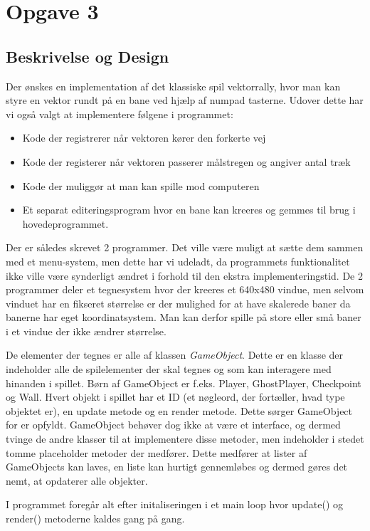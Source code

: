 \section{Opgave 3}
\subsection{Beskrivelse og Design}
Der ønskes en implementation af det klassiske spil vektorrally,
hvor man kan styre en vektor rundt på en bane ved hjælp af numpad tasterne.
Udover dette har vi også valgt at implementere følgene i programmet:
\begin{itemize}
  \item Kode der registrerer når vektoren kører den forkerte vej
  \item Kode der registerer når vektoren passerer målstregen og angiver antal træk
  \item Kode der muliggør at man kan spille mod computeren
  \item Et separat editeringsprogram hvor en bane kan kreeres og gemmes til brug i hovedeprogrammet.
\end{itemize}

Der er således skrevet 2 programmer. Det ville være muligt at sætte dem sammen med et menu-system,
men dette har vi udeladt, da programmets funktionalitet ikke ville være synderligt ændret i forhold til den ekstra implementeringstid.
De 2 programmer deler et tegnesystem hvor der kreeres et 640x480 vindue,
men selvom vinduet har en fikseret størrelse er der mulighed for at have skalerede baner da banerne har eget koordinatsystem.
Man kan derfor spille på store eller små baner i et vindue der ikke ændrer størrelse.

De elementer der tegnes er alle af klassen \emph{GameObject}. %
Dette er en klasse der indeholder alle de spilelementer der skal tegnes og som kan interagere med hinanden i spillet.
Børn af GameObject er f.eks. Player, GhostPlayer, Checkpoint og Wall. Hvert objekt i spillet har et ID
(et nøgleord, der fortæller, hvad type objektet er), en update metode og en render metode.
Dette sørger GameObject for er opfyldt. GameObject behøver dog ikke at være et interface,
og dermed tvinge de andre klasser til at implementere disse metoder,
men indeholder i stedet tomme placeholder metoder der medfører.
Dette medfører at lister af GameObjects kan laves,
en liste kan hurtigt gennemløbes og dermed gøres det nemt, at opdaterer alle objekter.

I programmet foregår alt efter initaliseringen  i et main loop hvor update() og render() metoderne kaldes gang på gang.

